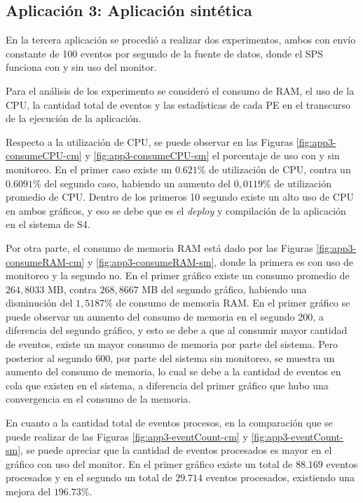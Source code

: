 \subsection{Aplicación 3: Aplicación sintética}
En la tercera aplicación se procedió a realizar dos experimentos, ambos con envío constante de 100 eventos por segundo de la fuente de datos, donde el SPS funciona con y sin uso del monitor.

Para el análisis de los experimento se consideró el consumo de RAM, el uso de la CPU, la cantidad total de eventos y las estadísticas de cada PE en el transcurso de la ejecución de la aplicación.

Respecto a la utilización de CPU, se puede observar en las Figuras \ref{fig:app3-consumeCPU-cm} y \ref{fig:app3-consumeCPU-sm} el porcentaje de uso con y sin monitoreo. En el primer caso existe un $0.621\%$ de utilización de CPU, contra un $0.6091\%$ del segundo caso, habiendo un aumento del $0,0119\%$ de utilización promedio de CPU. Dentro de los primeros 10 segundo existe un alto uso de CPU en ambos gráficos, y eso se debe que es el \textit{deploy} y compilación de la aplicación en el sistema de S4.

Por otra parte, el consumo de memoria RAM está dado por las Figuras \ref{fig:app3-consumeRAM-cm} y \ref{fig:app3-consumeRAM-sm}, donde la primera es con uso de monitoreo y la segundo no. En el primer gráfico existe un consumo promedio de $264,8033$ MB, contra $268,8667$ MB del segundo gráfico, habiendo una disminución del $1,5187\%$ de consumo de memoria RAM. En el primer gráfico se puede observar un aumento del consumo de memoria en el segundo 200, a diferencia del segundo gráfico, y esto se debe a que al consumir mayor cantidad de eventos, existe un mayor consumo de memoria por parte del sistema. Pero posterior al segundo 600, por parte del sistema sin monitoreo, se muestra un aumento del consumo de memoria, lo cual se debe a la cantidad de eventos en cola que existen en el sistema, a diferencia del primer gráfico que hubo una convergencia en el consumo de la memoria.

En cuanto a la cantidad total de eventos procesos, en la comparación que se puede realizar de las Figuras \ref{fig:app3-eventCount-cm} y \ref{fig:app3-eventCount-sm}, se puede apreciar que la cantidad de eventos procesados es mayor en el gráfico con uso del monitor. En el primer gráfico existe un total de $88.169$ eventos procesados y en el segundo un total de $29.714$ eventos procesados, existiendo una mejora del $196.73\%$.


